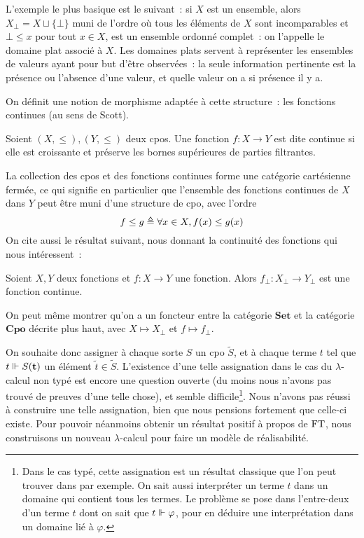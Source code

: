 \documentclass{article}
\begin{document}
\begin{expl}
    L'exemple le plus basique est le suivant~: si $X$ est un ensemble, alors $X_\bot = X \sqcup \{\bot\}$ muni de l'ordre où tous les éléments de $X$ sont incomparables et $\bot \leq x$ pour tout $x \in X$, est un ensemble ordonné complet~: on l'appelle le domaine plat associé à $X$. Les domaines plats servent à représenter les ensembles de valeurs ayant pour but d'être observées~: la seule information pertinente est la présence ou l'absence d'une valeur, et quelle valeur on a si présence il y a.
\end{expl}

On définit une notion de morphisme adaptée à cette structure~: les fonctions continues (au sens de Scott).

\begin{defi}
    Soient $(X,\leq), (Y,\leq)$ deux cpos. Une fonction $f : X \to Y$ est dite continue si elle est croissante et préserve les bornes supérieures de parties filtrantes.
\end{defi}

La collection des cpos et des fonctions continues forme une catégorie cartésienne fermée, ce qui signifie en particulier que l'ensemble des fonctions continues de $X$ dans $Y$ peut être muni d'une structure de cpo, avec l'ordre
\[f\leq g \triangleq \forall x \in X, f(x) \leq g(x)\]
On cite aussi le résultat suivant, nous donnant la continuité des fonctions qui nous intéressent~:
\begin{prop}
    Soient $X,Y$ deux fonctions et $f : X \to Y$ une fonction. Alors $f_\bot : X_\bot \to Y_\bot$ est une fonction continue.
\end{prop}

On peut même montrer qu'on a un foncteur entre la catégorie $\mathbf{Set}$ et la catégorie $\mathbf{Cpo}$ décrite plus haut, avec $X \mapsto X_\bot$ et $f \mapsto f_\bot$.

On souhaite donc assigner à chaque sorte $S$ un cpo $\tilde S$, et à chaque terme $t$ tel que $t\Vdash S(\mathbf{t})$ un élément $\tilde t \in \tilde S$. L'existence d'une telle assignation dans le cas du $\lambda$-calcul non typé est encore une question ouverte (du moins nous n'avons pas trouvé de preuves d'une telle chose), et semble difficile\footnote{Dans le cas typé, cette assignation est un résultat classique que l'on peut trouver dans \cite{Amadio_Curien_1998} par exemple. On sait aussi interpréter un terme $t$ dans un domaine qui contient tous les termes. Le problème se pose dans l'entre-deux d'un terme $t$ dont on sait que $t\Vdash \varphi$, pour en déduire une interprétation dans un domaine lié à $\varphi$.}. Nous n'avons pas réussi à construire une telle assignation, bien que nous pensions fortement que celle-ci existe. Pour pouvoir néanmoins obtenir un résultat positif à propos de $\mathrm{FT}$, nous construisons un nouveau $\lambda$-calcul pour faire un modèle de réalisabilité.
\end{document}
